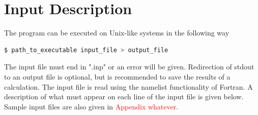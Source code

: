 \documentclass[12pt]{report}
\newcommand{\notetodylan}[1]{\textcolor{red}{#1}} %
\begin{document}
\section{Input Description}\label{inp_des}
The program can be executed on Unix-like systems in the following way
\begin{lstlisting}[language=bash]
	$ path_to_executable input_file > output_file
\end{lstlisting}

The input file must end in ".inp" or an error will be given. Redirection of stdout to an output file is optional, but is recommended to save the results of a calculation. The input file is read using the namelist functionality of Fortran. A description of what must appear on each line of the input file is given below. Sample input files are also given in \notetodylan{Appendix whatever}.
\end{document}
